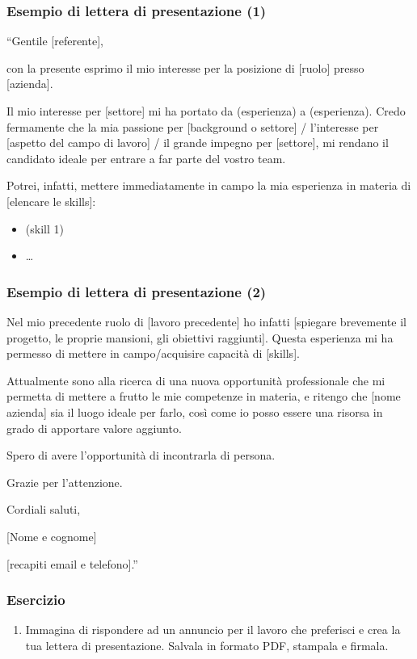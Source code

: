 \documentclass[handout]{beamer}
\begin{document}
\begin{frame}
\frametitle{Esempio di lettera di presentazione (1)}
\small
``Gentile [referente],

con la presente esprimo il mio interesse per la posizione di [ruolo] presso [azienda].

Il mio interesse per [settore] mi ha portato da (esperienza) a (esperienza). Credo fermamente che la mia passione per [background o settore] / l’interesse per [aspetto del campo di lavoro] / il grande impegno per [settore], mi rendano il candidato ideale per entrare a far parte del vostro team.

Potrei, infatti, mettere immediatamente in campo la mia esperienza in materia di [elencare le skills]:
\begin{itemize}
  \item (skill 1)
  \item \ldots
\end{itemize}
\end{frame}



\begin{frame}
\frametitle{Esempio di lettera di presentazione (2)}
\small
Nel mio precedente ruolo di [lavoro precedente] ho infatti [spiegare brevemente il progetto, le proprie mansioni, gli obiettivi raggiunti]. Questa esperienza mi ha permesso di mettere in campo/acquisire capacità di [skills].

Attualmente sono alla ricerca di una nuova opportunità professionale che mi permetta di mettere a frutto le mie competenze in materia, e ritengo che [nome azienda] sia il luogo ideale per farlo, così come io posso essere una risorsa in grado di apportare valore aggiunto.

Spero di avere l’opportunità di incontrarla di persona.

Grazie per l’attenzione.

Cordiali saluti,

[Nome e cognome]

[recapiti email e telefono].''
\end{frame}

\begin{frame}
\frametitle{Esercizio}
\begin{enumerate}
  \item Immagina di rispondere ad un annuncio per il lavoro che preferisci e crea la tua \alert{lettera di presentazione}. Salvala in formato PDF, stampala e firmala.
\end{enumerate}
\end{frame}
\end{document}

